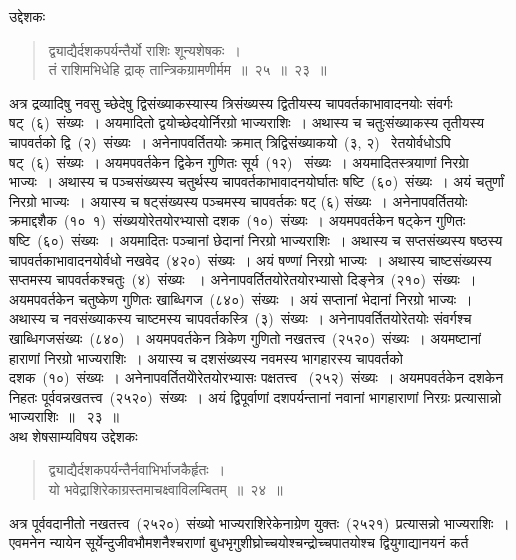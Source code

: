 \documentclass[11pt, openany]{book}
\begin{document}
\justifying
\indent
उद्देशकः \textendash\begin{quote}
{\ks द्व्याद्यैर्दशकपर्यन्तैर्यो राशिः शून्यशेषकः~।\\
तं राशिमभिधेहि द्राक् तान्त्रिकग्रामणीर्मम~॥~२५~॥~२३~॥}
\end{quote}


\newpage
\thispagestyle{fancy}
\fancyhf{}
\indent
अत्र द्रव्यादिषु नवसु च्छेदेषु द्विसंख्याकस्यास्य त्रिसंख्यस्य द्वितीयस्य चापवर्तकाभावादनयोः संवर्गः षट्~(६)~संख्यः~। अयमादितो द्वयोच्छेदयोर्निरग्रो भाज्यराशिः~। अथास्य च चतुःसंख्याकस्य तृतीयस्य चापवर्तको द्वि~(२)~संख्यः~। अनेनापवर्तितयोः क्रमात् त्रिद्विसंख्याकयो~(३, २)~ रेतयोर्वधोऽपि षट्~(६)~संख्यः~। अयमपवर्तकेन द्विकेन गुणितः सूर्य~(१२)~ संख्यः~। अयमादितस्त्रयाणां निरग्राे भाज्यः~। अथास्य च पञ्चसंख्यस्य चतुर्थस्य चापवर्तकाभावादनयोर्घातः षष्टि~(६०)~संख्यः~। अयं चतुर्णां निरग्रो भाज्यः~। अयास्य च षट्संख्यस्य पञ्चमस्य चापवर्तकः षट् (६) संख्यः~। अनेनापवर्तितयोः क्रमाद्दशैक~(१०\textendash\ १)~संख्ययोरेतयोरभ्यासो दशक~(१०)~संख्यः~। अयमपवर्तकेन षट्केन गुणितः षष्टि~(६०)~संख्यः~। अयमादितः पञ्चानां छेदानां निरग्रो भाज्यराशिः~। अथास्य च सप्तसंख्यस्य षष्ठस्य चापवर्तकाभावादनयोर्वधो नखवेद~(४२०)~संख्यः~। अयं षण्णां निरग्रो भाज्यः~। अथास्य चाष्टसंख्यस्य सप्तमस्य चापवर्तकश्चतुः~(४)~संख्यः ~। अनेनापवर्तितयोरेतयोरभ्यासो दिङ्नेत्र~(२१०)~संख्यः~। अयमपवर्तकेन चतुष्केण गुणितः खाब्धिगज~(८४०)~संख्यः~। अयं सप्तानां भेदानां निरग्रो भाज्यः~। अथास्य च नवसंख्याकस्य चाष्टमस्य चापवर्तकस्त्रि~(३)~संख्यः~। अनेनापवर्तितयोरेतयोः संवर्गश्च खाब्धिगजसंख्यः~(८४०)~। अयमपवर्तकेन त्रिकेण गुणितो नखतत्त्व~(२५२०)~संख्यः~। अयमष्टानां हाराणां निरग्रो भाज्यराशिः~। अयास्य च दशसंख्यस्य नवमस्य भागहारस्य चापवर्तको दशक~(१०)~संख्यः~। अनेनापवर्तितयोेरेतयोरभ्यासः पक्षतत्त्व ~(२५२)~संख्यः~। अयमपवर्तकेन दशकेन निहतः पूर्ववन्नखतत्त्व~(२५२०)~संख्यः~। अयं द्विपूर्वाणां दशपर्यन्तानां नवानां भागहाराणां निरग्रः प्रत्यासान्नो भाज्यराशिः~॥~ २३~॥\\
\indent
अथ शेषसाम्यविषय उद्देशकः \textendash
\begin{quote}
{\ku द्व्याद्यैर्दशकपर्यन्तैर्नवाभिर्भाजकैर्हृतः~।\\
यो भवेद्राशिरेकाग्रस्तमाचक्ष्वाविलम्बितम्~॥~२४~॥~}
\end{quote}

\indent
अत्र पूर्ववदानीतो नखतत्त्व~(२५२०)~संख्यो भाज्यराशिरेकेनाग्रेण युक्तः~(२५२१)~प्रत्यासन्नो भाज्यराशिः~। एवमनेन न्यायेन सूर्येन्दुजीवभौमशनैश्चराणां बुधभृगुशीघ्रोच्चयोश्चन्द्रोच्चपातयोश्च द्वियुगाद्यानयनं कर्त \textendash 
\end{document}
